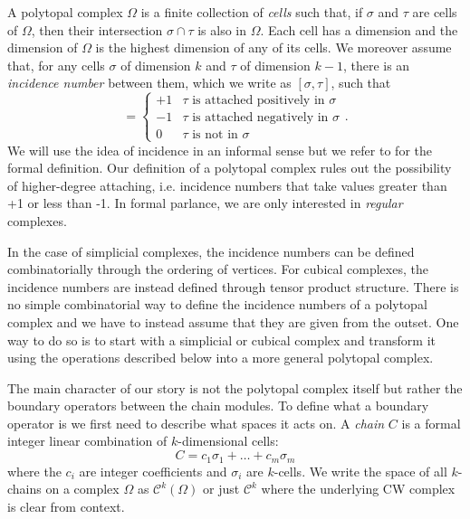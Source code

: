 \documentclass[twocolumn]{article}
\begin{document}
A polytopal complex $\Omega$ is a finite collection of \emph{cells} such that, if $\sigma$ and $\tau$ are cells of $\Omega$, then their intersection $\sigma\cap\tau$ is also in $\Omega$.
Each cell has a dimension and the dimension of $\Omega$ is the highest dimension of any of its cells.
We moreover assume that, for any cells $\sigma$ of dimension $k$ and $\tau$ of dimension $k - 1$, there is an \emph{incidence number} between them, which we write as $[\sigma, \tau]$, such that
\begin{equation}
    [\sigma, \tau] = \begin{cases} +1 & \tau\text{ is attached positively in }\sigma \\ -1 & \tau\text{ is attached negatively in }\sigma \\ 0 & \tau\text{ is not in }\sigma\end{cases}.
\end{equation}
We will use the idea of incidence in an informal sense but we refer to \cite{hatcher2002algebraic} for the formal definition.
Our definition of a polytopal complex rules out the possibility of higher-degree attaching, i.e. incidence numbers that take values greater than +1 or less than -1.
In formal parlance, we are only interested in \emph{regular} complexes.

In the case of simplicial complexes, the incidence numbers can be defined combinatorially through the ordering of vertices.
For cubical complexes, the incidence numbers are instead defined through tensor product structure.
There is no simple combinatorial way to define the incidence numbers of a polytopal complex and we have to instead assume that they are given from the outset.
One way to do so is to start with a simplicial or cubical complex and transform it using the operations described below into a more general polytopal complex.

The main character of our story is not the polytopal complex itself but rather the boundary operators between the chain modules.
To define what a boundary operator is we first need to describe what spaces it acts on.
A \emph{chain} $C$ is a formal integer linear combination of $k$-dimensional cells:
\begin{equation}
    C = c_1\sigma_1 + \ldots + c_m\sigma_m
\end{equation}
where the $c_i$ are integer coefficients and $\sigma_i$ are $k$-cells.
We write the space of all $k$-chains on a complex $\Omega$ as $\mathscr{C}^k(\Omega)$ or just $\mathscr{C}^k$ where the underlying CW complex is clear from context.
\end{document}
